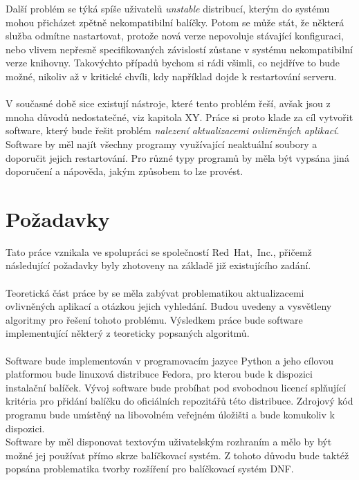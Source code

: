 \documentclass[
  field=inf,
  biblatex,
  glossaries,
  index
]{kidiplom}
\begin{document}
	Další problém se týká spíše uživatelů \textit{unstable} distribucí, kterým do systému mohou přicházet zpětně nekompatibilní balíčky. Potom se může stát, že některá služba odmítne nastartovat, protože nová verze nepovoluje stávající konfiguraci, nebo vlivem nepřesně specifikovaných závislostí zůstane v systému nekompatibilní verze knihovny. Takovýchto případů bychom si rádi všimli, co nejdříve to bude možné, nikoliv až v kritické chvíli, kdy například dojde k restartování serveru.
	\\
	\\
	V současné době sice existují nástroje, které tento problém řeší, avšak jsou z mnoha důvodů nedostatečné, viz kapitola XY. Práce si proto klade za cíl vytvořit software, který bude řešit problém \textit{nalezení aktualizacemi ovlivněných aplikací}. Software by měl najít všechny programy využívající neaktuální soubory a doporučit jejich restartování. Pro různé typy programů by měla být vypsána jiná doporučení a nápověda, jakým způsobem to lze provést.

	\section{Požadavky}
	Tato práce vznikala ve spolupráci se společností Red~Hat,~Inc., přičemž následující požadavky byly zhotoveny na základě již existujícího zadání.
	\\
	\\
	Teoretická část práce by se měla zabývat problematikou aktualizacemi ovlivněných aplikací a otázkou jejich vyhledání. Budou uvedeny a vysvětleny algoritmy pro řešení tohoto problému. Výsledkem práce bude software implementující některý z teoreticky popsaných algoritmů.
	\\
	\\
	Software bude implementován v programovacím jazyce Python a jeho cílovou platformou bude linuxová distribuce Fedora, pro kterou bude k dispozici instalační balíček. Vývoj software bude probíhat pod svobodnou licencí splňující kritéria pro přidání balíčku do oficiálních repozitářů této distribuce. Zdrojový kód programu bude umístěný na libovolném veřejném úložišti a bude komukoliv k dispozici.
	\\
	Software by měl disponovat textovým uživatelským rozhraním a mělo by být možné jej používat přímo skrze balíčkovací systém. Z tohoto důvodu bude taktéž popsána problematika tvorby rozšíření pro balíčkovací systém DNF\@.

\end{document}
